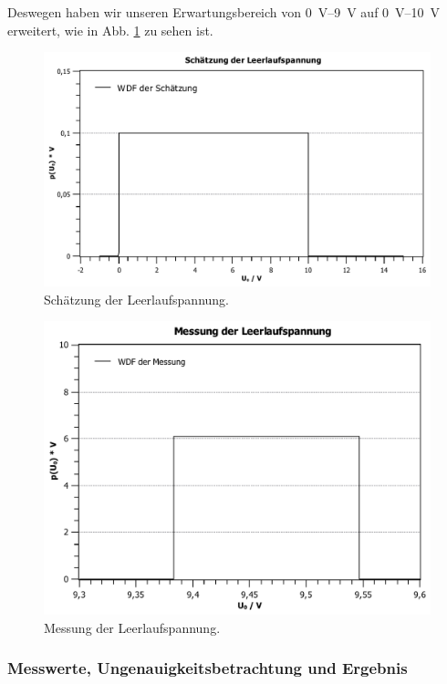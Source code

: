 \documentclass[11pt,a4paper,titlepage, ngerman]{article}
\begin{document}
				Deswegen haben wir unseren Erwartungsbereich von \SIrange{0}{9}{\V} auf \SIrange{0}{10}{\V} erweitert, wie in Abb. \ref{fig:spannung} zu sehen ist.			
				\begin{figure}	
					\centering
					\includegraphics[scale=0.8]{Spannungsschaetzung.pdf}
					\caption{Schätzung der Leerlaufspannung.}
					\label{fig:spannung}
				\end{figure}		
				\begin{figure}	
					\centering
					\includegraphics[scale=0.8]{Spannungsmessung_2.pdf} %
					\caption{Messung der Leerlaufspannung.}
					\label{fig:spannung2}
				\end{figure}	
				
			\subsubsection{Messwerte, Ungenauigkeitsbetrachtung und Ergebnis}
				\label{2.1.2}	
					
\end{document}
